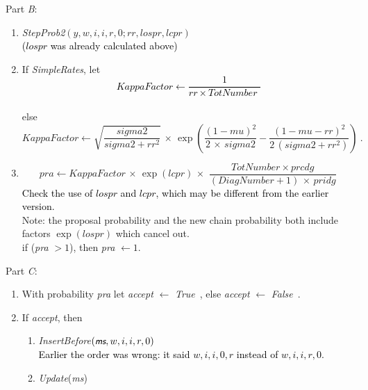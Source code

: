 \documentclass[a4paper,12pt,fleqn]{article}
\newcommand{\ttimes}{\,\times\,}
\newcommand{\nnm}[1]{\textsf{\small\textit{#1}\ }}
\newcommand{\ms}{\textsl{\textsf{\small ms}}} %
\newcommand{\addaa}[1]{{\textcolor[named]{Black}{#1}}}  %
\newcommand{\addca}[1]{{\textcolor[named]{Black}{#1}}}  %
\newcommand{\addcd}[1]{{\textcolor[named]{Black}{#1}}}
\begin{document}
Part \emph{B}:
\begin{enumerate}[resume]
\item \textit{StepProb2}$(y, w,i,i,r,0 ;  rr, lospr, lcpr)$\\
      \addca{($lospr$ was already calculated above)}
\item If \textit{SimpleRates}, let
      \addcd{
      \begin{equation}
      \textit{KappaFactor} \leftarrow \frac{1}{rr \times \textit{TotNumber } }
      \end{equation}
      }\\
      else
      \begin{equation}
      \textit{KappaFactor} \leftarrow \sqrt{ \frac{\textit{sigma2}}{\textit{sigma2} + rr^2} }
                  \ttimes \exp\left( \frac{\left(1 - \textit{mu} \right)^2}{2\ttimes\textit{sigma2}}
                   - \frac{\left(1 - \textit{mu}  - rr \right)^2}{2\,(\textit{sigma2} + rr^2)}  \right) \ .
      \end{equation}
\item
    \begin{equation}
     \textit{pra}  \leftarrow \textit{KappaFactor} \ttimes \exp( lcpr) \ttimes
                                   \frac{\textit{TotNumber}\ttimes\textit{prcdg}}
                                    {(\textit{DiagNumber}+1) \ttimes\textit{pridg}}
    \end{equation}
    \addaa{Check the use of $lospr$ and $ lcpr$, which may be different
    from the earlier version.}\\
    Note: the proposal probability and the new chain probability both include
    factors $\exp(lospr)$ which cancel out.\\
    if (\textit{pra} $ > 1$), then  \textit{pra} $ \leftarrow 1 $.
\end{enumerate}

Part \emph{C}:
\begin{enumerate}[resume]
\item With probability \textit{pra} let \textit{accept} $\leftarrow$ \nnm{True}, else
      \textit{accept} $\leftarrow$ \nnm{False}.
\item If \textit{accept}, then
      \begin{enumerate}
      \item \textit{InsertBefore}$(\ms,w,i,i,r,0)$\\
      \addaa{Earlier the order was wrong: it said $w,i,i,0,r$ instead of $w,i,i,r,0$. }
      \item \textit{Update}(\ms)
      \end{enumerate}
\end{enumerate}
\end{document}
